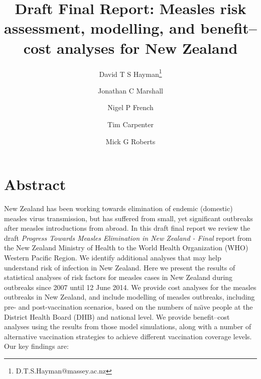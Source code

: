 \documentclass{article}
\begin{document}


\title{Draft Final Report: Measles risk assessment, modelling, and benefit--cost analyses for New Zealand}
\author[1]{David T S Hayman\thanks{D.T.S.Hayman@massey.ac.nz}}
\author[1] {Jonathan C Marshall}
\author[1] {Nigel P French}
\author[2] {Tim Carpenter}
\author[3] {Mick G Roberts}
\date{}
\maketitle

\tableofcontents

%  

\section{Abstract}

New Zealand has been working towards elimination of endemic (domestic) measles virus transmission, but has suffered from small, yet significant outbreaks after measles introductions from abroad. In this draft final report we review the draft \emph {Progress Towards Measles Elimination in New Zealand - Final} report from the New Zealand Ministry of Health to the World Health Organization (WHO) Western Pacific Region. We identify additional analyses that may help understand risk of infection in New Zealand. Here we present the results of statistical analyses of risk factors for measles cases in New Zealand during outbreaks since 2007 until 12 June 2014. We provide cost analyses for the measles outbreaks in New Zealand, and include modelling of measles outbreaks, including pre- and post-vaccination scenarios, based on the numbers of na\"{\i}ve people at the District Health Board (DHB) and national level. We provide benefit--cost analyses using the results from those model simulations, along with a number of alternative vaccination strategies to achieve different vaccination coverage levels. Our key findings are:
\end{document}
